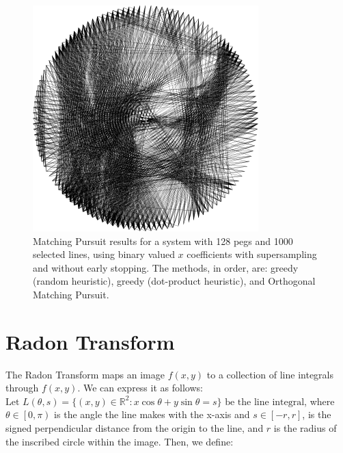 \begin{figure}[H]
\begin{minipage}{0.2\linewidth}
    \end{minipage}
    \begin{minipage}{0.2\linewidth}
        \centering
        \includegraphics[width=\linewidth]{images/mp_binary/omp_binary.png}
    \end{minipage}
    \caption{Matching Pursuit results for a system with 128 pegs and 1000 selected lines, using binary valued \(x\) coefficients with supersampling and without early stopping. The methods, in order, are: greedy (random heuristic), greedy (dot-product heuristic), and Orthogonal Matching Pursuit.}
    \label{fig:mp_binary_outputs}
\end{figure}

\section{Radon Transform}

The Radon Transform maps an image \(f(x,y)\) to a collection of line integrals through \(f(x,y)\). We can express it as follows: \(\text{Let } L(\theta, s) = \{(x, y) \in \mathbb{R}^2 : x\cos\theta + y\sin\theta = s\} \text{ be the line integral}\), where \(\theta \in \left[0, \pi\right)\) is the angle the line makes with the x-axis and \(s \in \left[ -r, r\right]\), is the signed perpendicular distance from the origin to the line, and \(r\)  is the radius of the inscribed circle within the image. Then, we define:


